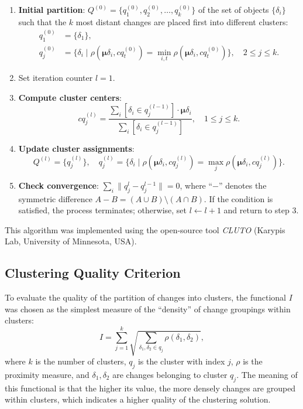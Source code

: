 \documentclass[11pt,a4paper]{article}
\begin{document}
\begin{enumerate}
    \item \textbf{Initial partition}: $Q^{(0)} = \{q_1^{(0)}, q_2^{(0)}, \ldots, q_k^{(0)}\}$ of the set of objects $\{\delta_i\}$ such that the $k$ most distant changes are placed first into different clusters:
    \begin{align}
        q_1^{(0)} &= \{\delta_1\}, \\
        q_j^{(0)} &= \{\delta_i \mid \rho(\boldsymbol{\mu}\delta_i, cq_t^{(0)}) = \min_{i,t} \rho(\boldsymbol{\mu}\delta_i, cq_t^{(0)})\}, \quad 2 \le j \le k.
    \end{align}
    \item Set iteration counter $l = 1$.
    \item \textbf{Compute cluster centers}:
    \begin{equation}
        cq_j^{(l)} = \frac{\sum_i [\delta_i \in q_j^{(l-1)}] \cdot \boldsymbol{\mu}\delta_i}{\sum_i [\delta_i \in q_j^{(l-1)}]}, \quad 1 \le j \le k.
    \end{equation}
    \item \textbf{Update cluster assignments}:
    \begin{equation}
        Q^{(l)} = \{q_j^{(l)}\}, \quad q_j^{(l)} = \{\delta_i \mid \rho(\boldsymbol{\mu}\delta_i, cq_j^{(l)}) = \max_j \rho(\boldsymbol{\mu}\delta_i, cq_j^{(l)})\}.
    \end{equation}
    \item \textbf{Check convergence}: $\sum_i \|q_j^l - q_j^{l-1}\| = 0$, where ``$-$'' denotes the symmetric difference $A - B = (A \cup B) \setminus (A \cap B)$. If the condition is satisfied, the process terminates; otherwise, set $l \leftarrow l + 1$ and return to step 3.
\end{enumerate}

This algorithm was implemented using the open-source tool \textit{CLUTO} (Karypis Lab, University of Minnesota, USA).

\subsection{Clustering Quality Criterion}
\label{sec:quality_clustering}

To evaluate the quality of the partition of changes into clusters, the functional $I$ was chosen as the simplest measure of the ``density'' of change groupings within clusters:
\begin{equation}
    I = \sum_{j=1}^{k} \sqrt{\sum_{\delta_1, \delta_2 \in q_j} \rho(\delta_1, \delta_2)},
\end{equation}
where $k$ is the number of clusters, $q_j$ is the cluster with index $j$, $\rho$ is the proximity measure, and $\delta_1, \delta_2$ are changes belonging to cluster $q_j$. The meaning of this functional is that the higher its value, the more densely changes are grouped within clusters, which indicates a higher quality of the clustering solution.
\end{document}
